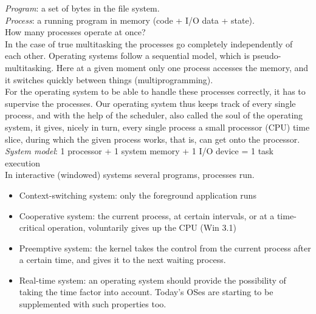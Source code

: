 \documentclass[margin=0px]{article}
\begin{document}
\textit{Program}: a set of bytes in the file system. \\
\textit{Process}: a running program in memory (code + I/O data + state). \\
How many processes operate at once? \\
In the case of true multitasking the processes go completely independently of each other. Operating systems follow a sequential model, which is pseudo-multitasking. Here at a given moment only one process accesses the memory, and it switches quickly between things (multiprogramming). \\
For the operating system to be able to handle these processes correctly, it has to supervise the processes. Our operating system thus keeps track of every single process, and with the help of the scheduler, also called the soul of the operating system, it gives, nicely in turn, every single process a small processor (CPU) time slice, during which the given process works, that is, can get onto the processor.
\textit{System model}: 1 processor + 1 system memory + 1 I/O device = 1 task execution \\
In interactive (windowed) systems several programs, processes run.
\begin{itemize}
    \item Context-switching system: only the foreground application runs
    \item Cooperative system: the current process, at certain intervals, or at a time-critical operation, voluntarily gives up the CPU (Win 3.1)
    \item Preemptive system: the kernel takes the control from the current process after a certain time, and gives it to the next waiting process.
    \item Real-time system: an operating system should provide the possibility of taking the time factor into account. Today's OSes are starting to be supplemented with such properties too.
\end{itemize}
\end{document}
